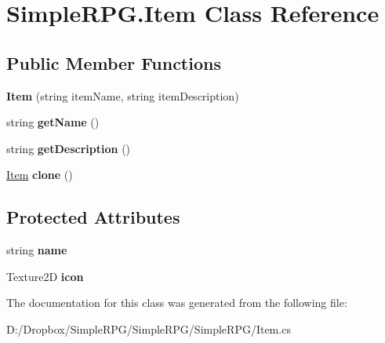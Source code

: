 \hypertarget{class_simple_r_p_g_1_1_item}{\section{Simple\+R\+P\+G.\+Item Class Reference}
\label{class_simple_r_p_g_1_1_item}
}
\subsection*{Public Member Functions}
\begin{DoxyCompactItemize}
\item 
\hypertarget{class_simple_r_p_g_1_1_item_a63d4839f76cceeb7f531c6ff5843993c}{{\bfseries Item} (string item\+Name, string item\+Description)}\label{class_simple_r_p_g_1_1_item_a63d4839f76cceeb7f531c6ff5843993c}

\item 
\hypertarget{class_simple_r_p_g_1_1_item_a7389a06ee32aa5f6bd22087a660b642f}{string {\bfseries get\+Name} ()}\label{class_simple_r_p_g_1_1_item_a7389a06ee32aa5f6bd22087a660b642f}

\item 
\hypertarget{class_simple_r_p_g_1_1_item_a4e5a4789bbbf66b9881afe307e971449}{string {\bfseries get\+Description} ()}\label{class_simple_r_p_g_1_1_item_a4e5a4789bbbf66b9881afe307e971449}

\item 
\hypertarget{class_simple_r_p_g_1_1_item_a82dba77a31a3d0898ea32a1f8ad1d8f6}{\hyperlink{class_simple_r_p_g_1_1_item}{Item} {\bfseries clone} ()}\label{class_simple_r_p_g_1_1_item_a82dba77a31a3d0898ea32a1f8ad1d8f6}

\end{DoxyCompactItemize}
\subsection*{Protected Attributes}
\begin{DoxyCompactItemize}
\item 
\hypertarget{class_simple_r_p_g_1_1_item_ad3f8fe06680aa41d2e8b09860ca8c9b5}{string {\bfseries name}}\label{class_simple_r_p_g_1_1_item_ad3f8fe06680aa41d2e8b09860ca8c9b5}

\item 
\hypertarget{class_simple_r_p_g_1_1_item_ad311fedc8d5f53b55f4053de21cb58b0}{Texture2\+D {\bfseries icon}}\label{class_simple_r_p_g_1_1_item_ad311fedc8d5f53b55f4053de21cb58b0}

\end{DoxyCompactItemize}


The documentation for this class was generated from the following file\+:\begin{DoxyCompactItemize}
\item 
D\+:/\+Dropbox/\+Simple\+R\+P\+G/\+Simple\+R\+P\+G/\+Simple\+R\+P\+G/Item.\+cs\end{DoxyCompactItemize}

